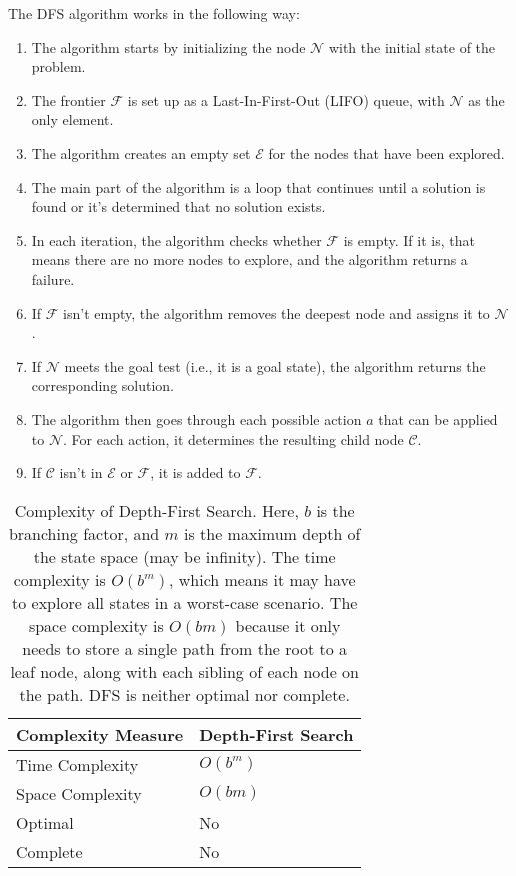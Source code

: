 \documentclass[a4paper,UKenglish,cleveref, autoref, thm-restate]{qlinhta}
\begin{document}
    The DFS algorithm works in the following way:
    \begin{enumerate}
        \item The algorithm starts by initializing the node $\mathcal{N}$ with the initial state of the problem.
        \item The frontier $\mathcal{F}$ is set up as a Last-In-First-Out (LIFO) queue, with $\mathcal{N}$ as the only element.
        \item The algorithm creates an empty set $\mathcal{E}$ for the nodes that have been explored.
        \item The main part of the algorithm is a loop that continues until a solution is found or it's determined that no solution exists.
        \item In each iteration, the algorithm checks whether $\mathcal{F}$ is empty. If it is, that means there are no more nodes to explore, and the algorithm returns a failure.
        \item If $\mathcal{F}$ isn't empty, the algorithm removes the deepest node and assigns it to $\mathcal{N}$.
        \item If $\mathcal{N}$ meets the goal test (i.e., it is a goal state), the algorithm returns the corresponding solution.
        \item The algorithm then goes through each possible action $a$ that can be applied to $\mathcal{N}$. For each action, it determines the resulting child node $\mathcal{C}$.
        \item If $\mathcal{C}$ isn't in $\mathcal{E}$ or $\mathcal{F}$, it is added to $\mathcal{F}$.
    \end{enumerate}

    \begin{table}[H]
        \centering
        \begin{tabular}{|l|l|}
            \hline
            \textbf{Complexity Measure} & \textbf{Depth-First Search} \\
            \hline
            Time Complexity             & $O(b^m)$                    \\
            \hline
            Space Complexity            & $O(bm)$                     \\
            \hline
            Optimal                     & No                          \\
            \hline
            Complete                    & No                          \\
            \hline
        \end{tabular}
        \caption{Complexity of Depth-First Search. Here, $b$ is the branching factor, and $m$ is the maximum depth of the state space (may be infinity). The time complexity is $O(b^m)$, which means it may have to explore all states in a worst-case scenario. The space complexity is $O(bm)$ because it only needs to store a single path from the root to a leaf node, along with each sibling of each node on the path. DFS is neither optimal nor complete.}
        \label{tab:dfs_complexity_detailed}
    \end{table}
\end{document}

